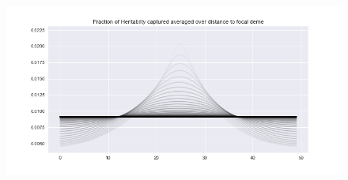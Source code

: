 \begin{figure}[h]
    \centering
    \includegraphics[scale=0.3]{img/H_plot_s_0.0001_m_0.1_pop_size_1e-5.png}
    \caption{}
    \label{fig:}
\end{figure}




